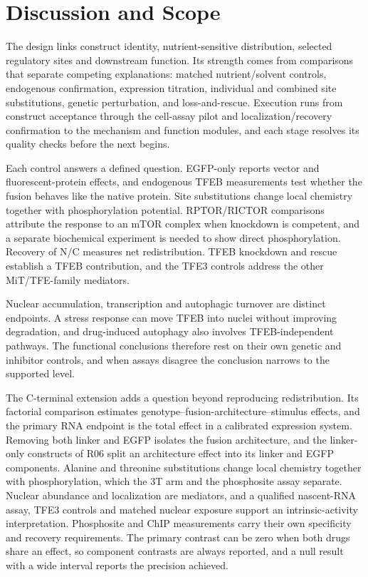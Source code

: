 \section{Discussion and Scope}
The design links construct identity, nutrient-sensitive distribution, selected regulatory sites and downstream function. Its strength comes from comparisons that separate competing explanations: matched nutrient/solvent controls, endogenous confirmation, expression titration, individual and combined site substitutions, genetic perturbation, and loss-and-rescue. Execution runs from construct acceptance through the cell-assay pilot and localization/recovery confirmation to the mechanism and function modules, and each stage resolves its quality checks before the next begins.

Each control answers a defined question. EGFP-only reports vector and fluorescent-protein effects, and endogenous TFEB measurements test whether the fusion behaves like the native protein. Site substitutions change local chemistry together with phosphorylation potential. RPTOR/RICTOR comparisons attribute the response to an mTOR complex when knockdown is competent, and a separate biochemical experiment is needed to show direct phosphorylation. Recovery of N/C measures net redistribution. TFEB knockdown and rescue establish a TFEB contribution, and the TFE3 controls address the other MiT/TFE-family mediators.

Nuclear accumulation, transcription and autophagic turnover are distinct endpoints. A stress response can move TFEB into nuclei without improving degradation, and drug-induced autophagy also involves TFEB-independent pathways. The functional conclusions therefore rest on their own genetic and inhibitor controls, and when assays disagree the conclusion narrows to the supported level.

The C-terminal extension adds a question beyond reproducing redistribution. Its factorial comparison estimates genotype--fusion-architecture--stimulus effects, and the primary RNA endpoint is the total effect in a calibrated expression system. Removing both linker and EGFP isolates the fusion architecture, and the linker-only constructs of R06 split an architecture effect into its linker and EGFP components. Alanine and threonine substitutions change local chemistry together with phosphorylation, which the 3T arm and the phosphosite assay separate. Nuclear abundance and localization are mediators, and a qualified nascent-RNA assay, TFE3 controls and matched nuclear exposure support an intrinsic-activity interpretation. Phosphosite and ChIP measurements carry their own specificity and recovery requirements. The primary contrast can be zero when both drugs share an effect, so component contrasts are always reported, and a null result with a wide interval reports the precision achieved.

